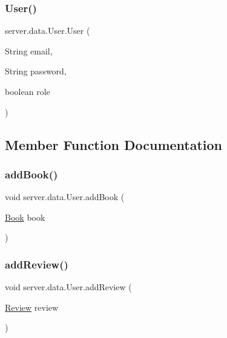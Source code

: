 \mbox{\label{classserver_1_1data_1_1_user_a43eb15725c3b2bfe218153a48bfbd610}} 
\subsubsection{\texorpdfstring{User()}{User()}\hspace{0.1cm}{\footnotesize\ttfamily [2/2]}}
{\footnotesize\ttfamily server.\+data.\+User.\+User (\begin{DoxyParamCaption}\item[{String}]{email,  }\item[{String}]{password,  }\item[{boolean}]{role }\end{DoxyParamCaption})}



\subsection{Member Function Documentation}
\mbox{\label{classserver_1_1data_1_1_user_a58385578ceb7c70fc9e8b0d1b2aa2e08}} 
\subsubsection{\texorpdfstring{add\+Book()}{addBook()}}
{\footnotesize\ttfamily void server.\+data.\+User.\+add\+Book (\begin{DoxyParamCaption}\item[{\hyperlink{classserver_1_1data_1_1_book}{Book}}]{book }\end{DoxyParamCaption})}

\mbox{\label{classserver_1_1data_1_1_user_a5baca76a3ea6ee21979a70c89581fb43}} 
\subsubsection{\texorpdfstring{add\+Review()}{addReview()}}
{\footnotesize\ttfamily void server.\+data.\+User.\+add\+Review (\begin{DoxyParamCaption}\item[{\hyperlink{classserver_1_1data_1_1_review}{Review}}]{review }\end{DoxyParamCaption})}

